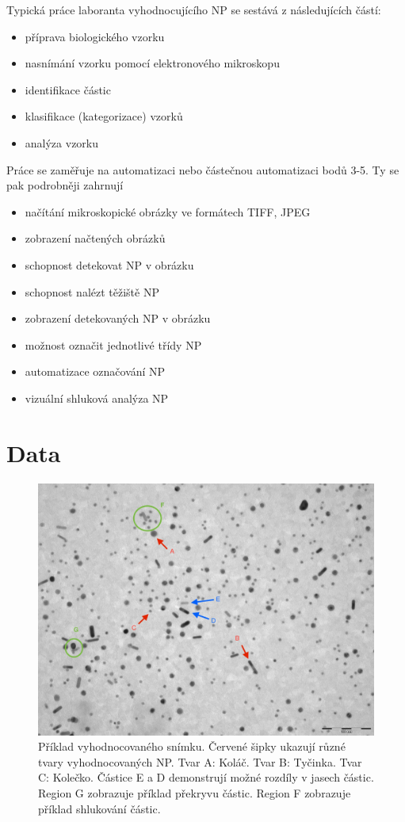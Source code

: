 \documentclass[11pt,twoside,a4paper,table]{book}
\begin{document}
Typická práce laboranta vyhodnocujícího NP se sestává z následujících částí:
\begin{itemize}
	\item příprava biologického vzorku
	\item nasnímání vzorku pomocí elektronového mikroskopu
	\item identifikace částic
	\item klasifikace (kategorizace) vzorků
	\item analýza vzorku
\end{itemize}
Práce se zaměřuje na automatizaci nebo částečnou automatizaci bodů 3-5. Ty se pak podrobněji zahrnují
\begin{itemize}
	\item načítání mikroskopické obrázky ve formátech TIFF, JPEG
	\item zobrazení načtených obrázků
	\item schopnost detekovat NP v obrázku
	\item schopnost nalézt těžiště NP
	\item zobrazení detekovaných NP v obrázku
	\item možnost označit jednotlivé třídy NP
	\item automatizace označování NP
	\item vizuální shluková analýza NP
\end{itemize}

\section{Data}

\begin{figure}[h]
\centering
\includegraphics[scale=0.3]{figures/data1.jpg}
\caption[Příklad vyhodnocovaného snímku.]{Příklad vyhodnocovaného snímku. Červené šipky ukazují různé tvary vyhodnocovaných NP. Tvar A: Koláč. Tvar B: Tyčinka. Tvar C: Kolečko. Částice E a D demonstrují možné rozdíly v jasech částic. Region G zobrazuje příklad překryvu částic. Region F zobrazuje příklad shlukování částic.}
\label{fig:data_example}
\end{figure}
\end{document}
